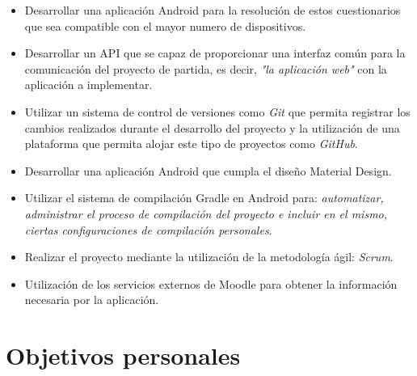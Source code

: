 \begin{itemize}
	
	\item Desarrollar una aplicación Android para la resolución de estos cuestionarios que sea compatible con el mayor numero de dispositivos.
	
	\item Desarrollar un API que se capaz de proporcionar una interfaz común para la comunicación del proyecto de partida, es decir, \emph{"la aplicación web"} con la aplicación a implementar.
	
	\item Utilizar un sistema de control de versiones como \emph{Git} que permita registrar los cambios realizados durante el desarrollo del proyecto y la utilización de una plataforma que permita alojar este tipo de proyectos como \emph{GitHub}.
		
	\item Desarrollar una aplicación Android que cumpla el diseño Material Design.
	
	\item Utilizar el sistema de compilación Gradle en Android para: \emph{automatizar, administrar el proceso de compilación del proyecto e incluir en el mismo, ciertas configuraciones de compilación personales}.
	
	\item Realizar el proyecto mediante la utilización de la metodología ágil: \emph{Scrum}.
	
	\item Utilización de los servicios externos de Moodle para obtener la información necesaria por la aplicación.

\end{itemize}


\section{Objetivos personales}

